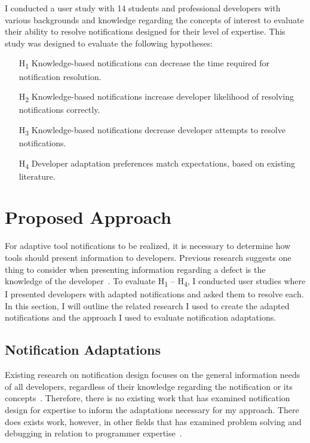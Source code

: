 I conducted a user study with 14 students and professional developers with various backgrounds and knowledge regarding the concepts of interest to evaluate their ability to resolve notifications designed for their level of expertise. This study was designed to evaluate the following hypotheses:
\begin{itemize}
    \item [H\textsubscript{1}] Knowledge-based notifications can decrease the time required for notification resolution.
    \item [H\textsubscript{2}] Knowledge-based notifications increase developer likelihood of resolving notifications correctly. 
    \item [H\textsubscript{3}] Knowledge-based notifications decrease developer attempts to resolve notifications.
    \item [H\textsubscript{4}] Developer adaptation preferences match expectations, based on existing literature.
\end{itemize}


\section{Proposed Approach}

For adaptive tool notifications to be realized, it is necessary to determine how tools should present information to developers. Previous research suggests one thing to consider when presenting information regarding a defect is the knowledge of the developer~\cite{johnson2016cross}.
To evaluate H\textsubscript{1} -- H\textsubscript{4}, I conducted user studies where I presented developers with adapted notifications and asked them to resolve each. In this section, I will outline the related research I used to create the adapted notifications and the approach I used to evaluate notification adaptations.

\subsection{Notification Adaptations}

Existing research on notification design focuses on the general information needs of all developers, regardless of their knowledge regarding the notification or its concepts~\cite{smith2015questions, barik14, robillard2014recommendation}. Therefore, there is no existing work that has examined notification design for expertise to inform the adaptations necessary for my approach.
There does exists work, however, in other fields that has examined problem solving and debugging in relation to programmer expertise~\cite{larkin1980expert, mckeithen1981knowledge, Wiedenbeck:1993:Mental}. 

